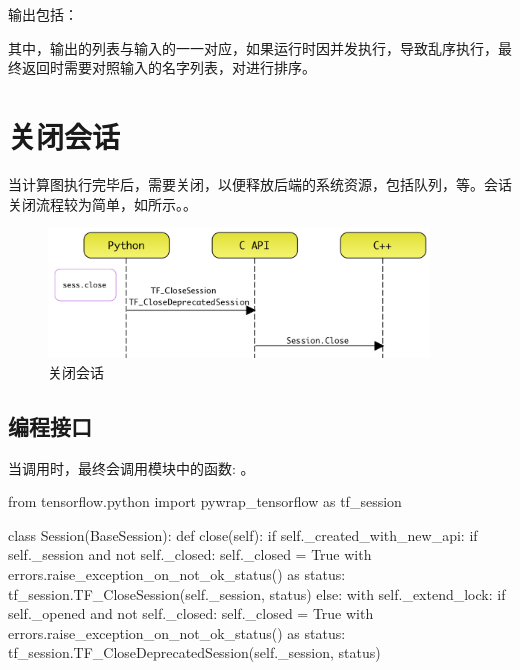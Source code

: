 \begin{content}
输出包括：

\begin{enum}
\end{enum}

其中，输出的列表与输入的一一对应，如果运行时因并发执行，导致乱序执行，最终返回时需要对照输入的名字列表，对进行排序。

\end{content}

\section{关闭会话}

\begin{content}

当计算图执行完毕后，需要关闭，以便释放后端的系统资源，包括队列，等。会话关闭流程较为简单，如所示。。

\begin{figure}[H]
\centering
\includegraphics[width=0.9\textwidth]{figures/py-session-close.png}
\caption{关闭会话}
 \label{fig:py-session-close}
\end{figure}

\subsection{编程接口}

当调用时，最终会调用模块中的函数: 。

\begin{leftbar}
\begin{python}[caption={tensorflow/python/client/session.py}]
from tensorflow.python import pywrap_tensorflow as tf_session

class Session(BaseSession):
  def close(self):
    if self._created_with_new_api:
      if self._session and not self._closed:
        self._closed = True
        with errors.raise_exception_on_not_ok_status() as status:
          tf_session.TF_CloseSession(self._session, status)
    else:
      with self._extend_lock:
        if self._opened and not self._closed:
          self._closed = True
          with errors.raise_exception_on_not_ok_status() as status:
            tf_session.TF_CloseDeprecatedSession(self._session, status)
\end{python}
\end{leftbar}


\end{content}
